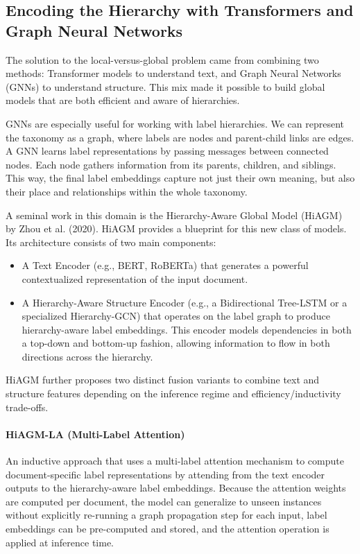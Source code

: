 \subsection{Encoding the Hierarchy with Transformers and Graph Neural Networks}

The solution to the local-versus-global problem came from combining two methods: Transformer models to understand text, and Graph Neural Networks (GNNs) to understand structure. This mix made it possible to build global models that are both efficient and aware of hierarchies. \cite{wang2024graphneuralnetworkstext, zhou-etal-2020-hierarchy}

GNNs are especially useful for working with label hierarchies. \cite{li2021heterogeneous} We can represent the taxonomy as a graph, where labels are nodes and parent-child links are edges. A GNN learns label representations by passing messages between connected nodes. Each node gathers information from its parents, children, and siblings. This way, the final label embeddings capture not just their own meaning, but also their place and relationships within the whole taxonomy.

A seminal work in this domain is the Hierarchy-Aware Global Model (HiAGM) by Zhou et al. (2020). HiAGM provides a blueprint for this new class of models. Its architecture consists of two main components:~\cite{zhou-etal-2020-hierarchy}

\begin{itemize}
	\item A Text Encoder (e.g., BERT, RoBERTa) that generates a powerful contextualized representation of the input document.
	\item A Hierarchy-Aware Structure Encoder (e.g., a Bidirectional Tree-LSTM or a specialized Hierarchy-GCN) that operates on the label graph to produce hierarchy-aware label embeddings. This encoder models dependencies in both a top-down and bottom-up fashion, allowing information to flow in both directions across the hierarchy.
\end{itemize}

HiAGM further proposes two distinct fusion variants to combine text and structure features depending on the inference regime and efficiency/inductivity trade-offs.

\paragraph{HiAGM-LA (Multi-Label Attention)}
An inductive approach that uses a multi-label attention mechanism to compute document-specific label representations by attending from the text encoder outputs to the hierarchy-aware label embeddings. Because the attention weights are computed per document, the model can generalize to unseen instances without explicitly re-running a graph propagation step for each input, label embeddings can be pre-computed and stored, and the attention operation is applied at inference time.


